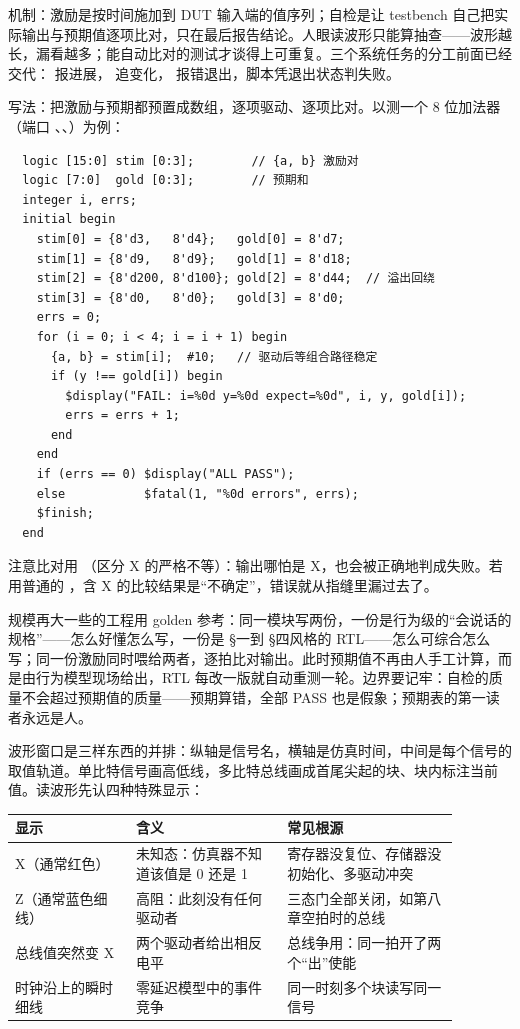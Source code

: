 机制：激励是按时间施加到 DUT 输入端的值序列；自检是让 testbench 自己把实际输出与预期值逐项比对，只在最后报告结论。人眼读波形只能算抽查——波形越长，漏看越多；能自动比对的测试才谈得上可重复。三个系统任务的分工前面已经交代： 报进展， 追变化， 报错退出，脚本凭退出状态判失败。

写法：把激励与预期都预置成数组，逐项驱动、逐项比对。以测一个 8 位加法器（端口 、、）为例：

\begin{lstlisting}
  logic [15:0] stim [0:3];        // {a, b} 激励对
  logic [7:0]  gold [0:3];        // 预期和
  integer i, errs;
  initial begin
    stim[0] = {8'd3,   8'd4};   gold[0] = 8'd7;
    stim[1] = {8'd9,   8'd9};   gold[1] = 8'd18;
    stim[2] = {8'd200, 8'd100}; gold[2] = 8'd44;  // 溢出回绕
    stim[3] = {8'd0,   8'd0};   gold[3] = 8'd0;
    errs = 0;
    for (i = 0; i < 4; i = i + 1) begin
      {a, b} = stim[i];  #10;   // 驱动后等组合路径稳定
      if (y !== gold[i]) begin
        $display("FAIL: i=%0d y=%0d expect=%0d", i, y, gold[i]);
        errs = errs + 1;
      end
    end
    if (errs == 0) $display("ALL PASS");
    else           $fatal(1, "%0d errors", errs);
    $finish;
  end
\end{lstlisting}

注意比对用 \code{!==}（区分 X 的严格不等）：输出哪怕是 X，也会被正确地判成失败。若用普通的 \code{!=}，含 X 的比较结果是“不确定”，错误就从指缝里漏过去了。

规模再大一些的工程用 golden 参考：同一模块写两份，一份是行为级的“会说话的规格”——怎么好懂怎么写，一份是 §一到 §四风格的 RTL——怎么可综合怎么写；同一份激励同时喂给两者，逐拍比对输出。此时预期值不再由人手工计算，而是由行为模型现场给出，RTL 每改一版就自动重测一轮。边界要记牢：自检的质量不会超过预期值的质量——预期算错，全部 PASS 也是假象；预期表的第一读者永远是人。

波形窗口是三样东西的并排：纵轴是信号名，横轴是仿真时间，中间是每个信号的取值轨道。单比特信号画高低线，多比特总线画成首尾尖起的块、块内标注当前值。读波形先认四种特殊显示：

\begin{longtable}{L{0.24\linewidth}L{0.3\linewidth}L{0.34\linewidth}}
\toprule
显示 & 含义 & 常见根源 \\
\midrule
X（通常红色） & 未知态：仿真器不知道该值是 0 还是 1 & 寄存器没复位、存储器没初始化、多驱动冲突 \\
Z（通常蓝色细线） & 高阻：此刻没有任何驱动者 & 三态门全部关闭，如第八章空拍时的总线 \\
总线值突然变 X & 两个驱动者给出相反电平 & 总线争用：同一拍开了两个“出”使能 \\
时钟沿上的瞬时细线 & 零延迟模型中的事件竞争 & 同一时刻多个块读写同一信号 \\
\bottomrule
\end{longtable}

